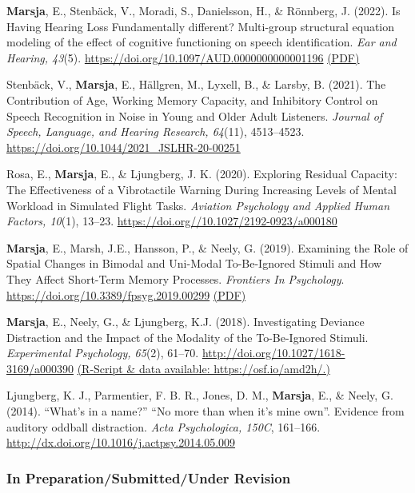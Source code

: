 \documentclass[]{article}
\begin{document}
\textbf{Marsja}, E., Stenbäck, V., Moradi, S., Danielsson, H., \&
Rönnberg, J. (2022). Is Having Hearing Loss Fundamentally different?
Multi-group structural equation modeling of the effect of cognitive
functioning on speech identification. \emph{Ear and Hearing, 43}(5).
\url{https://doi.org/10.1097/AUD.0000000000001196}
\href{https://bit.ly/EANDH22}{(PDF)}

Stenbäck, V., \textbf{Marsja}, E., Hällgren, M., Lyxell, B., \& Larsby,
B. (2021). The Contribution of Age, Working Memory Capacity, and
Inhibitory Control on Speech Recognition in Noise in Young and Older
Adult Listeners. \emph{Journal of Speech, Language, and Hearing
Research, 64}(11), 4513--4523.
\url{https://doi.org/10.1044/2021_JSLHR-20-00251}

Rosa, E., \textbf{Marsja}, E., \& Ljungberg, J. K. (2020). Exploring
Residual Capacity: The Effectiveness of a Vibrotactile Warning During
Increasing Levels of Mental Workload in Simulated Flight Tasks.
\emph{Aviation Psychology and Applied Human Factors, 10}(1), 13--23.
\url{https://doi.org//10.1027/2192-0923/a000180}

\textbf{Marsja}, E., Marsh, J.E., Hansson, P., \& Neely, G. (2019).
Examining the Role of Spatial Changes in Bimodal and Uni-Modal
To-Be-Ignored Stimuli and How They Affect Short-Term Memory Processes.
\emph{Frontiers In Psychology}.
\url{https://doi.org/10.3389/fpsyg.2019.00299}
\href{https://bit.ly/3LkKD19}{(PDF)}

\textbf{Marsja}, E., Neely, G., \& Ljungberg, K.J. (2018). Investigating
Deviance Distraction and the Impact of the Modality of the To-Be-Ignored
Stimuli. \emph{Experimental Psychology, 65}(2), 61--70.
\url{http://doi.org/10.1027/1618-3169/a000390}
\href{https://osf.io/amd2h/}{(R-Script \& data available:
https://osf.io/amd2h/.)}

Ljungberg, K. J., Parmentier, F. B. R., Jones, D. M., \textbf{Marsja},
E., \& Neely, G. (2014). ``What's in a name?'' ``No more than when it's
mine own''. Evidence from auditory oddball distraction. \emph{Acta
Psychologica, 150C}, 161--166.
\href{http://doi.org/10.1027/1618-3169/a000390}{http://dx.doi.org/10.1016/j.actpsy.2014.05.009}

\hypertarget{in-preparationsubmittedunder-revision}{%
\subsubsection{In Preparation/Submitted/Under
Revision}\label{in-preparationsubmittedunder-revision}}
\end{document}

